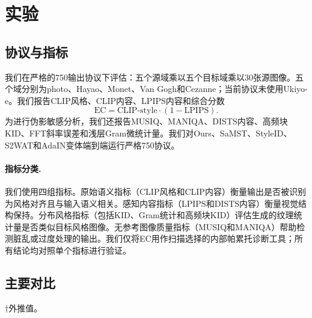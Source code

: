 ﻿\documentclass[letterpaper]{article}
\begin{document}
\section{实验}
\subsection{协议与指标}
我们在严格的750输出协议下评估：五个源域乘以五个目标域乘以30张源图像。五个域分别为photo、Hayao、Monet、Van Gogh和Cezanne；当前协议未使用Ukiyo-e。我们报告CLIP风格、CLIP内容、LPIPS内容和综合分数
\begin{equation}
    \mathrm{EC} = \mathrm{CLIP\mbox{-}style}\cdot(1-\mathrm{LPIPS}).
\end{equation}
为进行伪影敏感分析，我们还报告MUSIQ、MANIQA、DISTS内容、高频块KID、FFT斜率误差和浅层Gram微统计量。我们对Ours、SaMST、StyleID、S2WAT和AdaIN变体端到端运行严格750协议。

\paragraph{指标分类.}
我们使用四组指标。原始语义指标（CLIP风格和CLIP内容）衡量输出是否被识别为风格对齐且与输入语义相关。感知内容指标（LPIPS和DISTS内容）衡量视觉结构保持。分布风格指标（包括KID、Gram统计和高频块KID）评估生成的纹理统计量是否类似目标风格图像。无参考图像质量指标（MUSIQ和MANIQA）帮助检测脏乱或过度处理的输出。我们仅将EC用作扫描选择的内部帕累托诊断工具；所有结论均对照单个指标进行验证。

\subsection{主要对比}
\begin{table}[t]
\centering
\caption{严格750协议下的效率对比。$\uparrow$ = 越高越好，$\downarrow$ = 越低越好。推理时间为750张图像的端到端时间。标记$\dagger$的训练时间为外推值。}
\label{tab:main}
\small
\setlength{\tabcolsep}{5pt}
\smallskip
\footnoterule\small
$\dagger$外推值。
\end{table}
\end{document}
